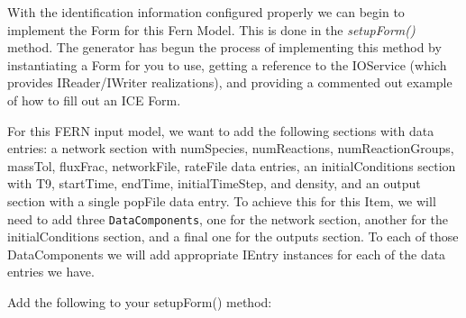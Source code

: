 With the identification information configured properly we can begin to
implement the Form for this Fern Model. This is done in the \emph{setupForm()}
method.
The generator has begun the process of implementing this method by instantiating
a Form for you to use, getting a reference to the IOService (which provides
IReader/IWriter realizations), and providing a commented out example of how to
fill out an ICE Form.

For this FERN input model, we want to add the following sections with data
entries: a network section with 
numSpecies, numReactions, numReactionGroups, massTol, fluxFrac, networkFile,
rateFile data entries, an initialConditions section with T9, startTime, endTime,
initialTimeStep, and density, and an output section with a single popFile
data entry.
To achieve this for this Item, we will need to add three
\texttt{DataComponents}, one for the network section, another for the
initialConditions section, and a final one for the outputs section. To each of
those DataComponents we will add appropriate IEntry instances for each of the data entries we have.

Add the following to your setupForm() method: 

